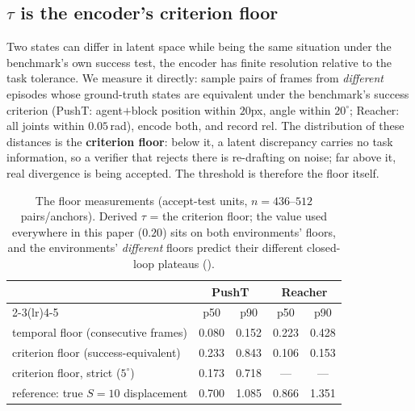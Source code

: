 \documentclass{article}
\newcommand{\degc}[1]{$#1^\circ$}
\begin{document}
\subsection{$\tau$ is the encoder's criterion floor}
\label{sec:calib-tau}
Two states can differ in latent space while being the same situation under the
benchmark's own success test, the encoder has finite resolution relative to the
task tolerance. We measure it directly: sample pairs of frames from
\emph{different} episodes whose ground-truth states are equivalent under the
benchmark's success criterion (PushT: agent$+$block position within $20$px, angle
within \degc{20}; Reacher: all joints within $0.05$\,rad), encode both, and record
$\mathrm{rel}$. The distribution of these distances is the \textbf{criterion floor}:
below it, a latent discrepancy carries no task information, so a verifier that
rejects there is re-drafting on noise; far above it, real divergence is being
accepted. The threshold is therefore the floor itself.

\begin{table}[h]
\centering
\small
\caption{The floor measurements (accept-test units, $n{=}436$--$512$ pairs/anchors).
Derived $\tau$ = the criterion floor; the value used everywhere in this paper
($0.20$) sits on both environments' floors, and the environments' \emph{different}
floors predict their different closed-loop plateaus ().}
\label{tab:floor}
\begin{tabular}{lcccc}
\toprule
& \multicolumn{2}{c}{PushT} & \multicolumn{2}{c}{Reacher} \\
\cmidrule(lr){2-3}\cmidrule(lr){4-5}
& p50 & p90 & p50 & p90 \\
\midrule
temporal floor (consecutive frames)     & 0.080 & 0.152 & 0.223 & 0.428 \\
criterion floor (success-equivalent)    & 0.233 & 0.843 & 0.106 & 0.153 \\
criterion floor, strict (\degc{5})      & 0.173 & 0.718 & ---   & ---   \\
\midrule
reference: true $S{=}10$ displacement   & 0.700 & 1.085 & 0.866 & 1.351 \\
\bottomrule
\end{tabular}
\end{table}
\end{document}
